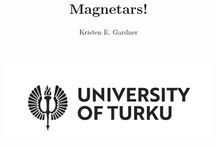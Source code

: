 \documentclass[hyperref=pdftex, presentation]{beamer}
\title[Introduction to Magnetars] %
{Magnetars!}
\author[Gardner]{Kristen E. Gardner}
\institute[] {UTU - Department of Physics and Astronomy\\}
\date[\today]
\begin{document}
\begin{frame}
	\vspace*{-.5cm}
	\begin{center}
		\begin{figure}
			\includegraphics[scale=.2]{figures/UTU_logo_EN_RGB.png}\hspace*{9cm}
		\end{figure}
	\end{center}
  \titlepage
\end{frame}
\end{document}
